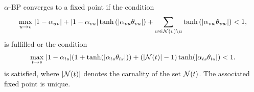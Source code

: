 \begin{corollary}
  $\alpha$-BP converges to a fixed point if the condition
  \begin{align}
    \underset{u \rightarrow v}{\max}\;  | 1-\alpha_{uv} | + | 1-\alpha_{vu} |\tanh{(| \alpha_{vu} \theta_{vu} |)} + \sum_{w \in \mathcal{N}(v) \backslash u} \tanh{(| \alpha_{{vw}} \theta_{vw} |)} < 1,
  \end{align}
  is fulfilled or the condition
  \begin{align}
    \underset{t \rightarrow s}{\max}\; | 1-\alpha_{ts} | (1 + \tanh(| \alpha_{ts} \theta_{ts} |)) + (| \mathcal{N}(t) |-1)\tanh(| \alpha_{ts} \theta_{ts} |) < 1.
  \end{align}
  is satisfied, where $| \mathcal{N}(t) |$ denotes the carnality of the set $\mathcal{N}(t)$. The associated fixed point is unique.
\end{corollary}

